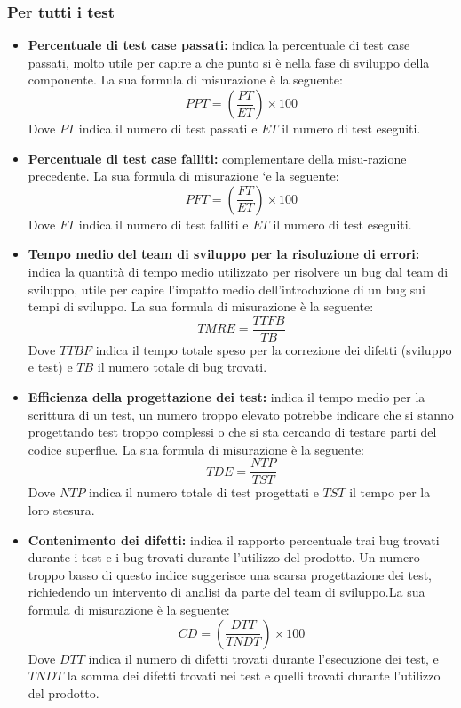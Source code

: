 \subsubsection{Per tutti i test}
\begin{itemize}
    \item \textbf{Percentuale di test case passati:} indica la percentuale di test case passati,  molto utile per capire a che punto si è nella fase di sviluppo della componente.  La sua formula di misurazione è la seguente:\newline
    \[
		PPT=(\frac{PT}{ET}) \times 100
	\]	
	Dove $PT$ indica il numero di test passati e $ET$ il numero di test eseguiti.
    \item \textbf{Percentuale di test case falliti:} complementare della misu-razione precedente.  La sua formula di misurazione `e la seguente:\newline
    \[
		PFT=(\frac{FT}{ET}) \times 100
	\]	
	Dove $FT$ indica il numero di test falliti e $ET$ il numero di test eseguiti.
    \item \textbf{Tempo medio del team di sviluppo per la risoluzione di errori:} indica  la  quantità  di  tempo  medio  utilizzato  per  risolvere  un  bug dal team di sviluppo,  utile per capire l’impatto medio dell’introduzione di un bug sui tempi di sviluppo.  La sua formula di misurazione è la seguente:\newline
    \[
		TMRE=\frac{TTFB}{TB}
	\]	
	Dove $TTBF$ indica il tempo totale speso per la correzione dei difetti (sviluppo e test) e $TB$ il numero totale di bug trovati.
    \item \textbf{Efficienza  della  progettazione  dei  test:} indica  il  tempo medio per la scrittura di un test, un numero troppo elevato potrebbe indicare che si stanno progettando test troppo complessi o che si sta cercando di  testare  parti  del  codice  superflue.   La  sua  formula  di  misurazione  è  la seguente:\newline
    \[
		TDE=\frac{NTP}{TST}
	\]	
	Dove $NTP$ indica il numero totale di test progettati e $TST$ il tempo per la loro stesura.
    \item \textbf{Contenimento dei difetti:} indica il rapporto percentuale trai bug trovati durante i test e i bug trovati durante l’utilizzo del prodotto.  Un numero  troppo  basso  di  questo  indice  suggerisce  una  scarsa  progettazione dei test, richiedendo un intervento di analisi da parte del team di sviluppo.La sua formula di misurazione è la seguente:\newline
    \[
		CD=(\frac{DTT}{TNDT}) \times 100
	\]	
	Dove $DTT$ indica il numero di difetti trovati durante l’esecuzione dei test, e $TNDT$ la somma dei difetti trovati nei test e quelli trovati durante l’utilizzo del prodotto.


\end{itemize}
